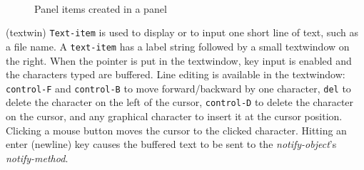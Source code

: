 \begin{figure}
\begin{center}
\mbox{
\epsfysize=5cm
}
\end{center}
\caption{Panel items created in a panel\label{panelitem}}
\end{figure}


\begin{refdesc}
{(textwin)}{
{\tt Text-item} is used to display or to input one short line of text,
such as a file name.
A {\tt text-item} has a label string followed by
a small textwindow on the right.
When the pointer is put in the textwindow, key input is enabled
and the characters typed are buffered.
Line editing is available in the textwindow: 
{\tt control-F} and {\tt control-B} to move forward/backward by one character,
{\tt del} to delete the character on the left of the cursor,
{\tt control-D} to delete the character on the cursor, and
any graphical character to insert it at the cursor position.
Clicking a mouse button moves the cursor to the clicked character.
Hitting an enter (newline) key causes the buffered text to be sent to
the {\em notify-object}'s {\em notify-method}.}




\end{refdesc}

